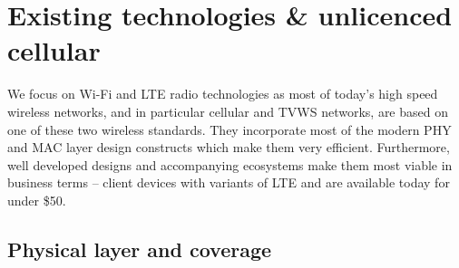 

\section{Existing technologies \& unlicenced \\ cellular}
We focus on Wi-Fi and LTE radio technologies as most of today's high speed wireless networks, and in particular cellular and TVWS networks, are based on one of these two wireless standards.
They incorporate most of the modern PHY and MAC layer design constructs which make them very efficient.
Furthermore, well developed designs and accompanying ecosystems make them most viable in business terms -- client devices with variants of LTE and \wf are available today for under \$50. 



\subsection{Physical layer and coverage}
\label{sec:PHY}


